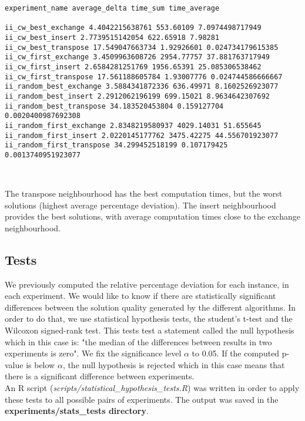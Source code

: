\begin{lstlisting}
experiment_name average_delta time_sum time_average

ii_cw_best_exchange 4.4042215638761 553.60109 7.0974498717949
ii_cw_best_insert 2.7739515142054 622.65918 7.98281
ii_cw_best_transpose 17.549047663734 1.92926601 0.024734179615385
ii_cw_first_exchange 3.4509963608726 2954.77757 37.881763717949
ii_cw_first_insert 2.6584281251769 1956.65391 25.085306538462
ii_cw_first_transpose 17.561188605784 1.93007776 0.024744586666667
ii_random_best_exchange 3.5884341872336 636.49971 8.1602526923077
ii_random_best_insert 2.2912062196199 699.15021 8.9634642307692
ii_random_best_transpose 34.183520453804 0.159127704 0.0020400987692308
ii_random_first_exchange 2.8348219580937 4029.14031 51.655645
ii_random_first_insert 2.0220145177762 3475.42275 44.556701923077
ii_random_first_transpose 34.299452518199 0.107179425 0.0013740951923077
\end{lstlisting}
\

The transpose neighbourhood has the best computation times, but the worst
solutions (highest average percentage deviation). The insert neighbourhood
provides the best solutions, with average computation times close to the
exchange neighbourhood.

\newpage

\subsection{Tests}
We previously computed the relative percentage deviation for each instance, in
each experiment. We would like to know if there are statistically significant
differences between the solution quality generated by the different algorithms.
In order to do that, we use statistical hypothesis tests, the student's t-test
and the Wilcoxon signed-rank test. This tests test a statement called the
null hypothesis which in this case is: "the median of the differences between
results in two experiments is zero". We fix the significance level $\alpha$ to
0.05. If the computed p-value is below $\alpha$, the null hypothesis is rejected
which in this case means that there is a significant difference between
experiments.\\

An R script (\emph{scripts/statistical\_hypothesis\_tests.R}) was written in order
to apply these tests to all possible pairs of experiments. The output was saved
in the \textbf{experiments/stats\_tests directory}.\\

